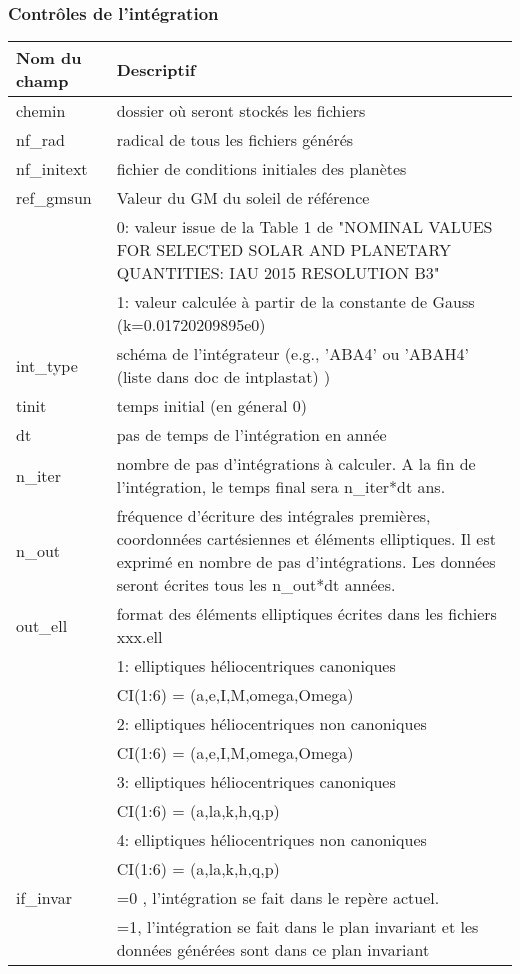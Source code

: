 \documentclass[11pt]{article}
\begin{document}
\subsubsection*{Contr\^oles de l'int\'egration}

\begin{tabularx}{\textwidth}{|l|X|}
\hline
Nom du champ& Descriptif \\ \hline 
chemin   & dossier o\`u seront stock\'es les fichiers \\ \hline
 nf\_rad    & radical de tous les fichiers g\'en\'er\'es\\ \hline
 nf\_initext& fichier de conditions initiales des plan\`etes\\ \hline

 ref\_gmsun& Valeur du GM du soleil de r\'ef\'erence \\ 
& 0: valeur issue de la Table 1 de "NOMINAL VALUES FOR SELECTED SOLAR AND PLANETARY QUANTITIES: IAU 2015 RESOLUTION B3"\\
& 1: valeur calculée à partir de la constante de Gauss (k=0.01720209895e0) \\\hline

 int\_type& sch\'ema de l'int\'egrateur (e.g., 'ABA4' ou 'ABAH4' (liste dans doc de intplastat) ) \\ \hline

 
 tinit & temps initial (en g\'eneral 0) \\ \hline

 dt& pas de temps de l'int\'egration en ann\'ee \\ \hline

 n\_iter& nombre de pas d'int\'egrations \`a calculer. A la fin de l'int\'egration, le temps final sera  n\_iter*dt ans.\\ \hline

 n\_out & fr\'equence d'\'ecriture des int\'egrales premi\`eres, coordonn\'ees cart\'esiennes et \'el\'ements elliptiques. Il est exprim\'e en nombre de pas d'int\'egrations. Les donn\'ees seront \'ecrites tous les n\_out*dt ann\'ees.
 \\ \hline
 out\_ell & format des \'el\'ements elliptiques \'ecrites dans les fichiers xxx.ell \\
&1:  elliptiques h\'eliocentriques canoniques\\
&	     CI(1:6) = (a,e,I,M,omega,Omega)\\
&2:  elliptiques h\'eliocentriques non canoniques\\
&	     CI(1:6) = (a,e,I,M,omega,Omega)\\
&3:  elliptiques h\'eliocentriques canoniques\\
&	     CI(1:6) = (a,la,k,h,q,p)\\
&4:  elliptiques h\'eliocentriques non canoniques\\
&	     CI(1:6) = (a,la,k,h,q,p)\\ \hline
 if\_invar & =0 , l'int\'egration se fait dans le rep\`ere actuel. \\
& =1, l'int\'egration se fait dans le plan invariant et les donn\'ees g\'en\'er\'ees sont dans ce plan invariant 
\\ \hline


\end{tabularx}
\end{document}
